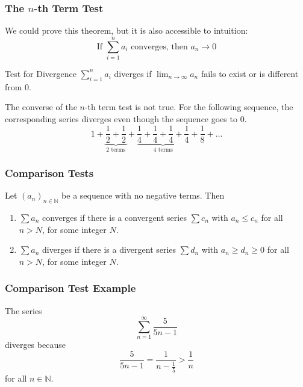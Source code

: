 \documentclass[xcolor=dvipsnames]{beamer}
\begin{document}
\begin{frame}
  \frametitle{The $n$-th Term Test}
  We could prove this theorem, but it is also accessible to intuition:
  \begin{equation}
    \label{eq:taingaik}
    \mbox{If }\sum_{i=1}^{n}a_{i}\mbox{ converges, then }a_{n}\longrightarrow{}0
  \end{equation}
  \begin{block}{Test for Divergence}
    $\sum_{i=1}^{n}a_{i}$ diverges if $\lim_{n\rightarrow\infty}a_{n}$
    fails to exist or is different from $0$.
  \end{block}
  The converse of the $n$-th term test is not true. For the following
  sequence, the corresponding series diverges even though the sequence
  goes to $0$.
  \begin{equation}
    \label{eq:aephieng}
    1+\underbrace{\frac{1}{2}+\frac{1}{2}}_\text{2 terms}+\underbrace{\frac{1}{4}+\frac{1}{4}+\frac{1}{4}+\frac{1}{4}}_\text{4 terms}+\frac{1}{8}+{\ldots}
  \end{equation}
\end{frame}

\begin{frame}
  \frametitle{Comparison Tests}
  Let $\left(a_{n}\right)_{n\in\mathbb{N}}$ be a sequence with no
  negative terms. Then
  \begin{enumerate}
  \item $\sum{}a_{n}$ converges if there is a convergent series
    $\sum{}c_{n}$ with $a_{n}\leq{}c_{n}$ for all $n>N$, for some
    integer $N$.
  \item $\sum{}a_{n}$ diverges if there is a divergent series
    $\sum{}d_{n}$ with $a_{n}\geq{}d_{n}\geq{}0$ for all $n>N$,
    for some integer $N$.
  \end{enumerate}
\end{frame}

\begin{frame}
  \frametitle{Comparison Test Example}
   The series
  \begin{equation}
    \label{eq:oopoosoo}
    \sum_{n=1}^{\infty}\frac{5}{5n-1}
  \end{equation}
  diverges because
  \begin{equation}
    \label{eq:quaejash}
    \frac{5}{5n-1}=\frac{1}{n-\frac{1}{5}}>\frac{1}{n}
  \end{equation}
for all $n\in\mathbb{N}$.
\end{frame}
\end{document}
